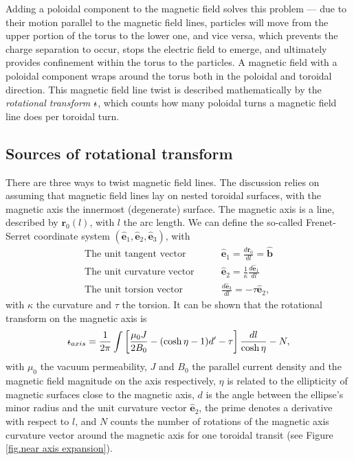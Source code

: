 \documentclass[my_thesis.tex]{subfiles}
\begin{document}
Adding a poloidal component to the magnetic field solves this problem --- due to their motion parallel to the magnetic field lines, particles will move from the upper portion of the torus to the lower one, and vice versa, which prevents the charge separation to occur, stops the electric field to emerge, and ultimately provides confinement within the torus to the particles. A magnetic field with a poloidal component wraps around the torus both in the poloidal and toroidal direction. This magnetic field line twist is described mathematically by the \emph{rotational transform} $\text{$\iota\!\!$-}$, which counts how many poloidal turns a magnetic field line does per toroidal turn. 

\subsection{Sources of rotational transform} 
There are three ways to twist magnetic field lines. The discussion relies on assuming that magnetic field lines lay on nested toroidal surfaces, with the magnetic axis the innermost (degenerate) surface. The magnetic axis is a line, described by $\mathbf{r}_0(l)$, with $l$ the arc length. We can define the so-called Frenet-Serret coordinate system $(\hat{\mathbf{e}}_1,\hat{\mathbf{e}}_2,\hat{\mathbf{e}}_3)$, with 
\begin{align}
    \text{The unit tangent vector}\qquad &\hat{\mathbf{e}}_1=\frac{d\mathbf{r}_0}{dl} = \hat{\mathbf{b}}\\
    \text{The unit curvature vector}\qquad &\hat{\mathbf{e}}_2=\frac{1}{\kappa}\frac{d\hat{\mathbf{e}}_1}{dl}\\
    \text{The unit torsion vector}\qquad &\frac{d\hat{\mathbf{e}}_3}{dl}= -\tau \hat{\mathbf{e}}_2,
\end{align} 
with $\kappa$ the curvature and $\tau$ the torsion. It can be shown \citep{mercierEquilibriumStabilityToroidal1964,helanderTheoryPlasmaConfinement2014} that the rotational transform on the magnetic axis is
\begin{equation}
    \text{$\iota\!\!$-}_{axis} = \frac{1}{2\pi}\int\left[\frac{\mu_0 J}{2B_0}-(\cosh\eta-1)d'-\tau\right]\frac{dl}{\cosh\eta} - N,
\end{equation}
with $\mu_0$ the vacuum permeability, $J$ and $B_0$ the parallel current density and the magnetic field magnitude on the axis respectively, $\eta$ is related to the ellipticity of magnetic surfaces close to the magnetic axis, $d$ is the angle between the ellipse's minor radius and the unit curvature vector $\hat{\mathbf{e}}_2$, the prime denotes a derivative with respect to $l$, and $N$ counts the number of rotations of the magnetic axis curvature vector around the magnetic axis for one toroidal transit (see Figure \ref{fig.near axis expansion}). 
\end{document}
